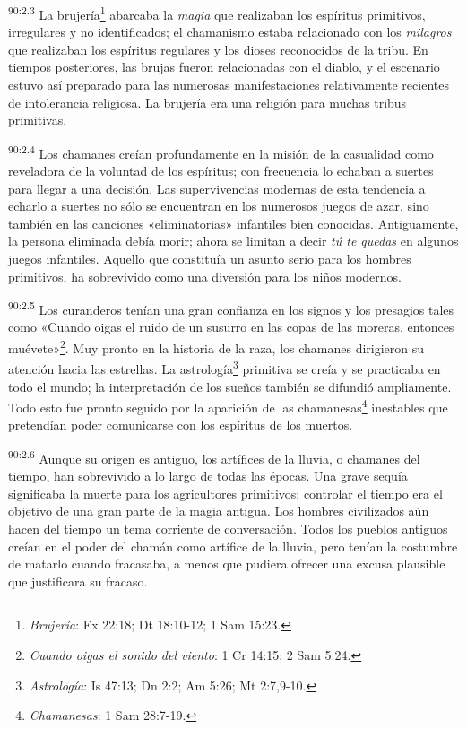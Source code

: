 \par
\textsuperscript{90:2.3} La brujería\footnote{\textit{Brujería}: Ex 22:18; Dt 18:10-12; 1 Sam 15:23.} abarcaba la \textit{magia} que realizaban los espíritus primitivos, irregulares y no identificados; el chamanismo estaba relacionado con los \textit{milagros} que realizaban los espíritus regulares y los dioses reconocidos de la tribu. En tiempos posteriores, las brujas fueron relacionadas con el diablo, y el escenario estuvo así preparado para las numerosas manifestaciones relativamente recientes de intolerancia religiosa. La brujería era una religión para muchas tribus primitivas.

\par
\textsuperscript{90:2.4} Los chamanes creían profundamente en la misión de la casualidad como reveladora de la voluntad de los espíritus; con frecuencia lo echaban a suertes para llegar a una decisión. Las supervivencias modernas de esta tendencia a echarlo a suertes no sólo se encuentran en los numerosos juegos de azar, sino también en las canciones «eliminatorias» infantiles bien conocidas. Antiguamente, la persona eliminada debía morir; ahora se limitan a decir \textit{tú te quedas} en algunos juegos infantiles. Aquello que constituía un asunto serio para los hombres primitivos, ha sobrevivido como una diversión para los niños modernos.

\par
\textsuperscript{90:2.5} Los curanderos tenían una gran confianza en los signos y los presagios tales como «Cuando oigas el ruido de un susurro en las copas de las moreras, entonces muévete»\footnote{\textit{Cuando oigas el sonido del viento}: 1 Cr 14:15; 2 Sam 5:24.}. Muy pronto en la historia de la raza, los chamanes dirigieron su atención hacia las estrellas. La astrología\footnote{\textit{Astrología}: Is 47:13; Dn 2:2; Am 5:26; Mt 2:7,9-10.} primitiva se creía y se practicaba en todo el mundo; la interpretación de los sueños también se difundió ampliamente. Todo esto fue pronto seguido por la aparición de las chamanesas\footnote{\textit{Chamanesas}: 1 Sam 28:7-19.} inestables que pretendían poder comunicarse con los espíritus de los muertos.

\par
\textsuperscript{90:2.6} Aunque su origen es antiguo, los artífices de la lluvia, o chamanes del tiempo, han sobrevivido a lo largo de todas las épocas. Una grave sequía significaba la muerte para los agricultores primitivos; controlar el tiempo era el objetivo de una gran parte de la magia antigua. Los hombres civilizados aún hacen del tiempo un tema corriente de conversación. Todos los pueblos antiguos creían en el poder del chamán como artífice de la lluvia, pero tenían la costumbre de matarlo cuando fracasaba, a menos que pudiera ofrecer una excusa plausible que justificara su fracaso.

